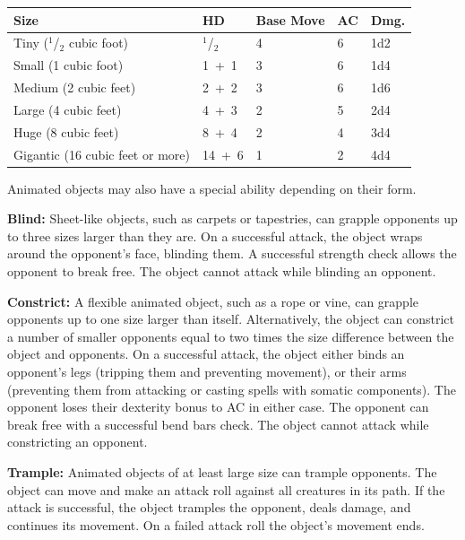 \begin{multicols}{2}
\noindent
\begin{tabular}{|p{}|p{}|p{}|p{}|p{}|}
\hline
Size	& HD	& Base Move	& AC	& Dmg. \\
\hline\hline
\rowcolor[gray]{.9}Tiny ($^1$/$_2$ cubic foot)	& $^1$/$_2$ 	& 4	& 6	& 1d2 \\
Small (1 cubic foot)	& 1~+~1	& 3	& 6	& 1d4 \\
\rowcolor[gray]{.9}Medium (2 cubic feet)	& 2~+~2	& 3	& 6	& 1d6 \\
Large (4 cubic feet)	& 4~+~3	& 2	& 5	& 2d4 \\
\rowcolor[gray]{.9}Huge (8 cubic feet)	& 8~+~4	& 2	& 4	& 3d4 \\
Gigantic (16 cubic feet or more)	& 14~+~6	& 1	& 2	& 4d4 \\
\hline
\end{tabular}

Animated objects may also have a special ability depending on their form.

\textbf{Blind:} Sheet-like objects, such as carpets or tapestries, can grapple opponents up to three sizes larger than they are.  On a successful attack, the object wraps around the opponent's face, blinding them.  A successful strength check allows the opponent to break free.  The object cannot attack while blinding an opponent.

\textbf{Constrict:}  A flexible animated object, such as a rope or vine, can grapple opponents up to one size larger than itself.  Alternatively, the object can constrict a number of smaller opponents equal to two times the size difference between the object and opponents. On a successful attack, the object either binds an opponent's legs (tripping them and preventing movement), or their arms (preventing them from attacking or casting spells with somatic components).  The opponent loses their dexterity bonus to AC in either case.  The opponent can break free with a successful bend bars check.  The object cannot attack while constricting an opponent.   

\textbf{Trample:} Animated objects of at least large size can trample opponents.  The object can move and make an attack roll against all creatures in its path.  If the attack is successful, the object tramples the opponent, deals damage, and continues its movement.  On a failed attack roll the object's movement ends.

\vspace{1em}
 

\end{multicols}
